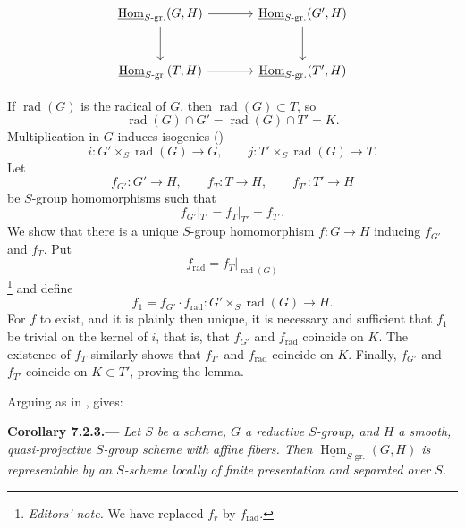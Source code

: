 \[
\begin{tikzcd}[column sep=large,row sep=large]
\underline{\operatorname{Hom}}_{S\text{-}\mathrm{gr.}}(G,H)
  \arrow[r]
  \arrow[d]
&
\underline{\operatorname{Hom}}_{S\text{-}\mathrm{gr.}}(G',H)
  \arrow[d]
\\
\underline{\operatorname{Hom}}_{S\text{-}\mathrm{gr.}}(T,H)
  \arrow[r]
&
\underline{\operatorname{Hom}}_{S\text{-}\mathrm{gr.}}(T',H)
\end{tikzcd}


\]

If \(\operatorname{rad}(G)\) is the radical of \(G\), then
\(\operatorname{rad}(G)\subset T\), so
\[
  \operatorname{rad}(G)\cap G'
  =
  \operatorname{rad}(G)\cap T'
  =
  K.
\]
Multiplication in \(G\) induces isogenies ()
\[
  i:G'\times_S\operatorname{rad}(G)\longrightarrow G,
  \qquad
  j:T'\times_S\operatorname{rad}(G)\longrightarrow T.
\]
Let
\[
  f_{G'}:G'\to H,\qquad
  f_T:T\to H,\qquad
  f_{T'}:T'\to H
\]
be \(S\)-group homomorphisms such that
\[
  f_{G'}|_{T'}=f_T|_{T'}=f_{T'}.
\]
We show that there is a unique \(S\)-group homomorphism \(f:G\to H\)
inducing \(f_{G'}\) and \(f_T\). Put
\[
  f_{\mathrm{rad}}
  =
  f_T|_{\operatorname{rad}(G)}
\]
\footnote{\textit{Editors' note.} We have replaced \(f_r\) by
\(f_{\mathrm{rad}}\).}
and define
\[
  f_1=f_{G'}\cdot f_{\mathrm{rad}}:
  G'\times_S\operatorname{rad}(G)\longrightarrow H.
\]
For \(f\) to exist, and it is plainly then unique, it is necessary and
sufficient that \(f_1\) be trivial on the kernel of \(i\), that is,
that \(f_{G'}\) and \(f_{\mathrm{rad}}\) coincide on \(K\). The
existence of \(f_T\) similarly shows that \(f_{T'}\) and
\(f_{\mathrm{rad}}\) coincide on \(K\). Finally, \(f_{G'}\) and
\(f_{T'}\) coincide on \(K\subset T'\), proving the lemma.

Arguing as in ,  gives:

\par\medskip\noindent{}\textbf{Corollary 7.2.3.---}\enspace
\emph{Let \(S\) be a scheme, \(G\) a reductive \(S\)-group, and \(H\)
a smooth, quasi-projective \(S\)-group scheme with affine fibers. Then
\(\underline{\operatorname{Hom}}_{S\text{-}\mathrm{gr.}}(G,H)\) is
representable by an \(S\)-scheme locally of finite presentation and
separated over \(S\).}

